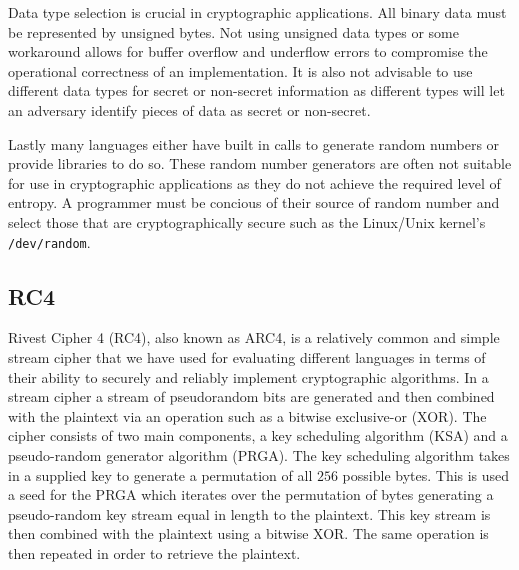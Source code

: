 Data type selection is crucial in cryptographic applications. All binary data must be represented by unsigned bytes. Not using unsigned data types or some workaround allows 
for buffer overflow and underflow errors to compromise the operational correctness of an implementation. It is also not advisable to use different data types for secret or 
non-secret information as different types will let an adversary identify pieces of data as secret or non-secret.

Lastly many languages either have built in calls to generate random numbers or provide libraries to do so. These random number generators are often not suitable for use 
in cryptographic applications as they do not achieve the required level of entropy. A programmer must be concious of their source of random number and select those that are 
cryptographically secure such as the Linux/Unix kernel's \texttt{/dev/random}.

\subsection{RC4}

Rivest Cipher 4 (RC4), also known as ARC4, is a relatively common and simple stream cipher that we have 
used for evaluating different languages in terms of their ability to securely and reliably implement 
cryptographic algorithms. In a stream cipher a stream of pseudorandom bits are generated and then combined 
with the plaintext via an operation such as a bitwise exclusive-or (XOR). The cipher consists of two main 
components, a key scheduling algorithm (KSA) and a pseudo-random generator algorithm (PRGA). The key scheduling algorithm 
takes in a supplied key to generate a permutation of all $256$ possible bytes. This is used a seed for the 
PRGA which iterates over the permutation of bytes generating a pseudo-random key stream equal in length to 
the plaintext. This key stream is then combined with the plaintext using a bitwise XOR. The same operation is 
then repeated in order to retrieve the plaintext.

